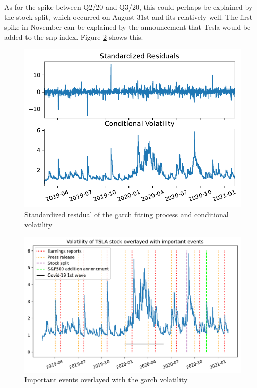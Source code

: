 As for the spike between Q2/20 and Q3/20, this could perhaps be explained by the stock split, which occurred on August 31st and fits relatively well. The first spike in November can be explained by the announcement that Tesla would be added to the \Gls{snp} index. Figure \ref{fig:volatility_garch} shows this.
\begin{figure}
	\centering
	\includegraphics[width=\textwidth]{img/img_resid_garch.pdf}
	\caption{Standardized residual of the \acrshort{garch} fitting process and conditional volatility}
	\label{fig:resid_garch}
\end{figure}

\begin{figure}
	\centering
	\includegraphics[width=\textwidth]{img/img_volatility_explanation.pdf}
	\caption{Important events overlayed with the \acrshort{garch} volatility}
	\label{fig:volatility_garch}
\end{figure}


